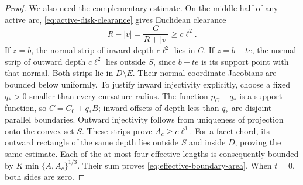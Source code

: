 \begin{proof}
We also need the complementary estimate. On the middle half of any
active arc, \eqref{eq:active-disk-clearance} gives Euclidean clearance
\[
                     R-|v|=\frac{G}{R+|v|}\ge c\ell^2.
\]
If $z=b$, the normal strip of inward depth $c\ell^2$ lies in $C$.
If $z=b-te$, the normal strip of outward depth $c\ell^2$ lies outside
$S$, since $b-te$ is its support point with that normal. Both strips
lie in $D\setminus E$. Their normal-coordinate Jacobians are bounded
below uniformly. To justify inward injectivity explicitly, choose a
fixed $q_*>0$ smaller than every curvature radius. The function
$p_C-q_*$ is a support function, so $C=C_0+q_*\overline B$; inward
offsets of depth less than $q_*$ are disjoint parallel boundaries.
Outward injectivity follows from uniqueness of projection onto the
convex set $S$. These strips prove $A_c\ge c\ell^3$.
For a facet chord, its outward rectangle of the same depth lies outside
$S$ and inside $D$, proving the same estimate. Each of the at most four
effective lengths is consequently bounded by
$K\min\{A,A_c\}^{1/3}$. Their sum proves
\eqref{eq:effective-boundary-area}. When $t=0$, both sides are zero.
\end{proof}

